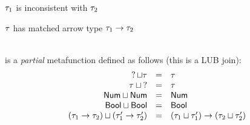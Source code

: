 \documentclass{article}
\begin{document}
 $\TMV_1$ is inconsistent with $\TMV_2$
%
\begin{mathpar}





\end{mathpar}

 $\TMV$ has matched arrow type
$\TArrow{\TMV_1}{\TMV_2}$
%
\begin{mathpar}

\end{mathpar} \\

 is a \emph{partial} metafunction defined as
follows (this is a LUB join):
%
\newcommand{\joinsTo}[3]{\ensuremath{\TJoin{#1}{#2} & = & #3}}
\[\begin{array}{rcl}
  \joinsTo{\TUnknown}{\TMV}{\TMV} \\
  \joinsTo{\TMV}{\TUnknown}{\TMV} \\
  \joinsTo{\TNum}{\TNum}{\TNum} \\
  \joinsTo{\TBool}{\TBool}{\TBool} \\
  \joinsTo{(\TArrow{\TMV_1}{\TMV_2})}{(\TArrow{\TMV_1'}{\TMV_2'})}{\TArrow{(\TJoin{\TMV_1}{\TMV_1'})}{(\TJoin{\TMV_2}{\TMV_2'})}} \\
\end{array}\]
\end{document}
